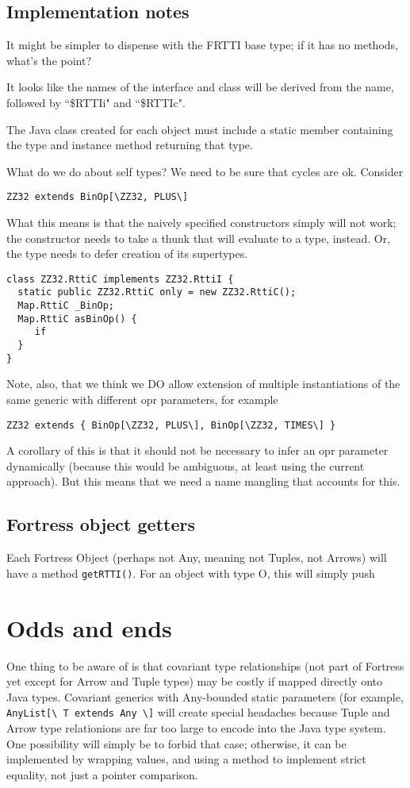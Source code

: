 \documentclass[11pt]{article}
\begin{document}
\subsection{Implementation notes}
It might be simpler to dispense with the FRTTI base type; if it has no methods, what's the point?

It looks like the names of the interface and class will be derived from the name, followed by ``\$RTTIi" and ``\$RTTIc".

The Java class created for each object must include a static member containing the type and instance method returning that type.

What do we do about self types?  We need to be sure that cycles are ok.  Consider
\begin{verbatim}
ZZ32 extends BinOp[\ZZ32, PLUS\]
\end{verbatim}
What this means is that the naively specified constructors simply will not work; the constructor needs to take a thunk that will evaluate to a type, instead.  Or, the type needs to defer creation of its supertypes.
\begin{verbatim}
class ZZ32.RttiC implements ZZ32.RttiI {
  static public ZZ32.RttiC only = new ZZ32.RttiC();
  Map.RttiC _BinOp;
  Map.RttiC asBinOp() {
     if 
  }
}
\end{verbatim}

Note, also, that we think we DO allow extension of multiple instantiations of the same generic with different opr parameters, for example
\begin{verbatim}
ZZ32 extends { BinOp[\ZZ32, PLUS\], BinOp[\ZZ32, TIMES\] }
\end{verbatim}
A corollary of this is that it should not be necessary to infer an opr parameter dynamically (because this would be ambiguous, at least using the current approach).  But this means that we need a name mangling that accounts for this.

\subsection{Fortress object getters}

Each Fortress Object (perhaps not Any, meaning not Tuples, not Arrows) will have a method \verb+getRTTI()+.  For an object with type O, this will simply push 


\section{Odds and ends}

One thing to be aware of is that covariant type relationships (not part of Fortress yet except for Arrow and Tuple types) may be costly if mapped directly onto Java types.  Covariant generics with Any-bounded static parameters (for example,  \verb+AnyList[\ T extends Any \]+ will create special headaches because Tuple and Arrow type relationions are far too large to encode into the Java type system.  One possibility will simply be to forbid that case; otherwise, it can be implemented by wrapping values, and using a method to implement strict equality, not just a pointer comparison. 
\end{document}
